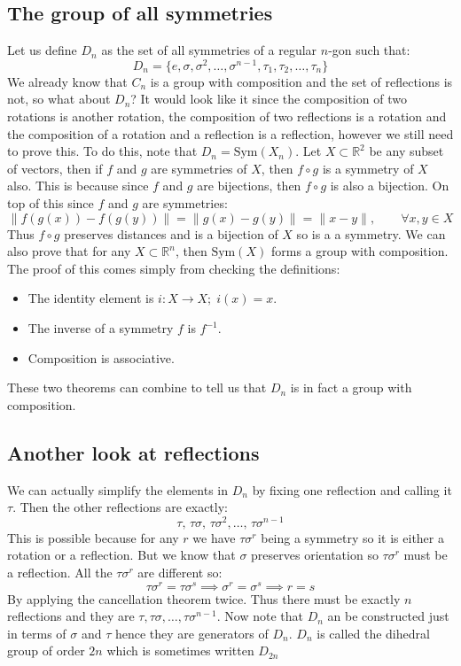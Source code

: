 \documentclass[12pt]{article}
\begin{document}
\subsection*{The group of all symmetries}
Let us define \(D_n\) as the set of all symmetries of a regular \(n\)-gon such that:
\[D_n=\{e,\sigma,\sigma^2,\dots,\sigma^{n-1},\tau_1,\tau_2,\dots,\tau_n\}\]
We already know that \(C_n\) is a group with composition and the set of reflections is not, so what about \(D_n\)? It would look like it since the composition of two rotations is another rotation, the composition of two reflections is a rotation and the composition of a rotation and a reflection is a reflection, however we still need to prove this. To do this, note that \(D_n=\text{Sym}(X_n)\). Let \(X\subset\mathbb{R}^2\) be any subset of vectors, then if \(f\) and \(g\) are symmetries of \(X\), then \(f\circ g\) is a symmetry of \(X\) also. This is because since \(f\) and \(g\) are bijections, then \(f\circ g\) is also a bijection. On top of this since \(f\) and \(g\) are symmetries:
\[\|f(g(x))-f(g(y))\|=\|g(x)-g(y)\|=\|x-y\|,\qquad\forall x,y\in X\]
Thus \(f\circ g\) preserves distances and is a bijection of \(X\) so is a a symmetry. We can also prove that for any \(X\subset\mathbb{R}^n\), then \(\text{Sym}(X)\) forms a group with composition. The proof of this comes simply from checking the definitions:
\begin{itemize}
    \item The identity element is \(i:X\to X;\; i(x)=x\).
    \item The inverse of a symmetry \(f\) is \(f^{-1}\).
    \item Composition is associative.
\end{itemize}
These two theorems can combine to tell us that \(D_n\) is in fact a group with composition.
\subsection*{Another look at reflections}
We can actually simplify the elements in \(D_n\) by fixing one reflection and calling it \(\tau\). Then the other reflections are exactly:
\[\tau,\,\tau\sigma,\,\tau\sigma^2,\dots,\,\tau\sigma^{n-1}\]
This is possible because for any \(r\) we have \(\tau\sigma^r\) being a symmetry so it is either a rotation or a reflection. But we know that \(\sigma\) preserves orientation so \(\tau\sigma^r\) must be a reflection. All the \(\tau\sigma^r\) are different so:
\[\tau\sigma^r=\tau\sigma^s\implies \sigma^r=\sigma^s\implies r=s\]
By applying the cancellation theorem twice. Thus there must be exactly \(n\) reflections and they are \(\tau,\tau\sigma,\dots,\tau\sigma^{n-1}\). Now note that \(D_n\) an be constructed just in terms of \(\sigma\) and \(\tau\) hence they are generators of \(D_n\). \(D_n\) is called the dihedral group of order \(2n\) which is sometimes written \(D_{2n}\)
\end{document}
